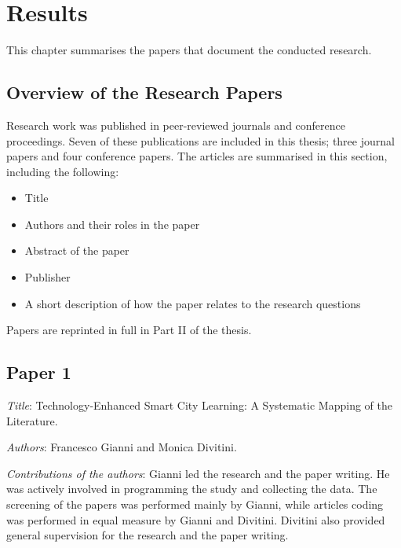 \chapter{Results}
\label{cha:results}

This chapter summarises the papers that document the conducted research.


\section{Overview of the Research Papers}
\label{papers}

Research work was published in peer-reviewed journals and conference proceedings. Seven of these publications are included in this thesis; three journal papers and four conference papers. The articles are summarised in this section, including the following:
\begin{itemize}
	\itemsep1pt\parskip0pt 
	\item Title 
	\item Authors and their roles in the paper 
	\item Abstract of the paper
	\item Publisher 
	\item A short description of how the paper relates to the research questions
\end{itemize}

Papers are reprinted in full in Part II of the thesis.


\section[P1: Technology-Enhanced Smart City Learning: A Systematic Mapping of the Literature.][Paper 1]{Paper 1}
\label{paper-1}

\emph{Title}: Technology-Enhanced Smart City Learning: A Systematic Mapping of the Literature.

\emph{Authors}: Francesco Gianni and Monica Divitini.

\emph{Contributions of the authors}: Gianni led the research and the paper writing. He was actively involved in programming the study and collecting the data. The screening of the papers was performed mainly by Gianni, while articles coding was performed in equal measure by Gianni and Divitini. Divitini also provided general supervision for the research and the paper writing.

